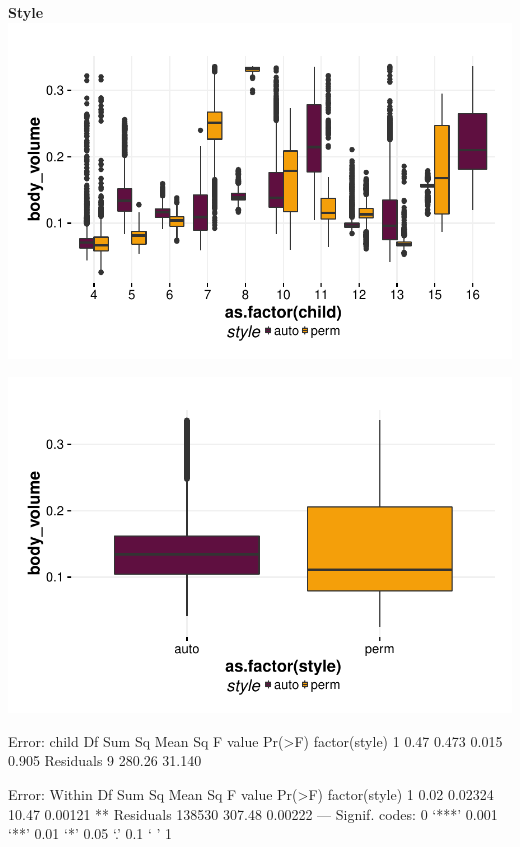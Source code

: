 \documentclass{article}
\begin{document}
\textbf{Style}
\includegraphics{features-plot_body_volume_child_style_quiz}

\includegraphics{features-plot_body_volume_style_quiz}

\begin{Schunk}
\begin{Soutput}
Error: child
              Df Sum Sq Mean Sq F value Pr(>F)
factor(style)  1   0.47   0.473   0.015  0.905
Residuals      9 280.26  31.140               

Error: Within
                  Df Sum Sq Mean Sq F value  Pr(>F)   
factor(style)      1   0.02 0.02324   10.47 0.00121 **
Residuals     138530 307.48 0.00222                   
---
Signif. codes:  0 ‘***’ 0.001 ‘**’ 0.01 ‘*’ 0.05 ‘.’ 0.1 ‘ ’ 1
\end{Soutput}
\end{Schunk}
\end{document}
